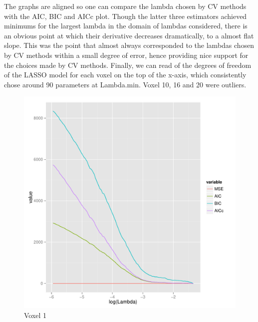\documentclass[english]{amsart}
\begin{document}
The graphs are aligned so one can compare the lambda chosen by CV methods with the AIC, BIC and AICc plot.  Though the latter three estimators achieved minimums for the largest lambda in the domain of lambdas considered, there is an obvious point at which their derivative decreases dramatically, to a almost flat slope.  This was the point that almost always corresponded to the lambdas chosen by CV methods within a small degree of error, hence providing nice support for the choices made by CV methods.  Finally, we can read of the degrees of freedom of the LASSO model for each voxel on the top of the x-axis, which consistently chose around 90 parameters at Lambda.min. Voxel 10, 16 and 20 were outliers.  

\begin{figure}[H]
  \includegraphics[width=\linewidth]{Voxel_1_AIC.pdf}
  \caption{Voxel 1}
\endminipage\hfill
\vspace{-5mm}

\end{figure}
\end{document}
